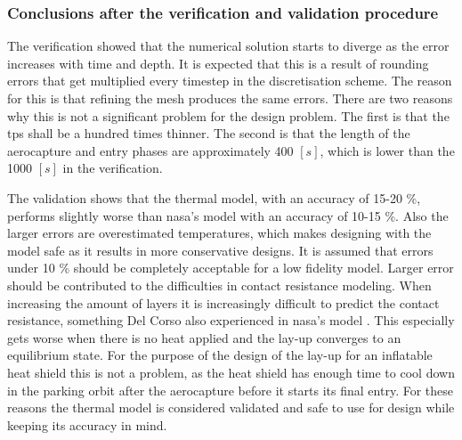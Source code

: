 \subsubsection{Conclusions after the verification and validation procedure}
The verification showed that the numerical solution starts to diverge as the error increases with time and depth. It is expected that this is a result of rounding errors that get multiplied every timestep in the discretisation scheme. The reason for this is that refining the mesh produces the same errors. There are two reasons why this is not a significant problem for the design problem. The first is that the \gls{tps} shall be a hundred times thinner. The second is that the length of the aerocapture and entry phases are approximately 400 $\left[s\right]$, which is lower than the 1000 $\left[s\right]$ in the verification. 
 
The validation shows that the thermal model, with an accuracy of 15-20 \%, performs slightly worse than \gls{nasa}'s model with an accuracy of 10-15 \%. Also the larger errors are overestimated temperatures, which makes designing with the model safe as it results in more conservative designs. It is assumed that errors under 10 \% should be completely acceptable for a low fidelity model. Larger error should be contributed to the difficulties in contact resistance modeling. When increasing the amount of layers it is increasingly difficult to predict the contact resistance, something Del Corso also experienced in \gls{nasa}'s model \cite{Corso2009}. This especially gets worse when there is no heat applied and the lay-up converges to an equilibrium state. For the purpose of the design of the lay-up for an inflatable heat shield this is not a problem, as the heat shield has enough time to cool down in the parking orbit after the aerocapture before it starts its final entry. For these reasons the thermal model is considered validated and safe to use for design while keeping its accuracy in mind.